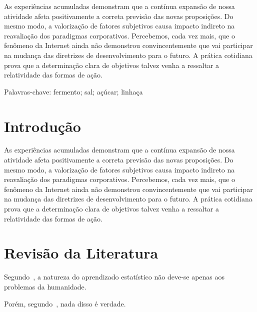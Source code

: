 \documentclass[chapter=TITLE,section=Title,espaco=duplo,tocpage=plain,appendix=Name,floatnumber=continuous]{abnt}
\begin{document}


\UTPCapa
\UTPFalsaFolhaDeRosto
\UTPFolhaDeRosto

\begin{resumo}
As experiências acumuladas demonstram que a contínua expansão de nossa
atividade afeta positivamente a correta previsão das novas proposições. Do
mesmo modo, a valorização de fatores subjetivos causa impacto indireto na
reavaliação dos paradigmas corporativos. Percebemos, cada vez mais, que o
fenômeno da Internet ainda não demonstrou convincentemente que vai
participar na mudança das diretrizes de desenvolvimento para o futuro. A
prática cotidiana prova que a determinação clara de objetivos talvez venha
a ressaltar a relatividade das formas de ação.

Palavras-chave: fermento; sal; açúcar; linhaça
\end{resumo}

\listoffigures
\listoftables
\listadequadros
\sumario

\chapter{Introdução}

As experiências acumuladas demonstram que a contínua expansão de nossa
atividade afeta positivamente a correta previsão das novas proposições. Do
mesmo modo, a valorização de fatores subjetivos causa impacto indireto na
reavaliação dos paradigmas corporativos. Percebemos, cada vez mais, que o
fenômeno da Internet ainda não demonstrou convincentemente que vai
participar na mudança das diretrizes de desenvolvimento para o futuro. A
prática cotidiana prova que a determinação clara de objetivos talvez venha
a ressaltar a relatividade das formas de ação. 

\chapter{Revisão da Literatura}

Segundo~\cite{joachims1998text}, a natureza do aprendizado estatístico não
deve-se apenas aos problemas da humanidade.

Porém, segundo~\cite{vapnik2000nature}, nada disso é verdade.
\end{document}
